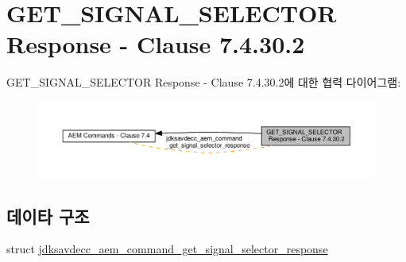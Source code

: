 \hypertarget{group__command__get__signal__selector__response}{}\section{G\+E\+T\+\_\+\+S\+I\+G\+N\+A\+L\+\_\+\+S\+E\+L\+E\+C\+T\+OR Response -\/ Clause 7.4.30.2}
\label{group__command__get__signal__selector__response}
G\+E\+T\+\_\+\+S\+I\+G\+N\+A\+L\+\_\+\+S\+E\+L\+E\+C\+T\+OR Response -\/ Clause 7.4.30.2에 대한 협력 다이어그램\+:
\nopagebreak
\begin{figure}[H]
\begin{center}
\leavevmode
\includegraphics[width=350pt]{group__command__get__signal__selector__response}
\end{center}
\end{figure}
\subsection*{데이타 구조}
\begin{DoxyCompactItemize}
\item 
struct \hyperlink{structjdksavdecc__aem__command__get__signal__selector__response}{jdksavdecc\+\_\+aem\+\_\+command\+\_\+get\+\_\+signal\+\_\+selector\+\_\+response}
\end{DoxyCompactItemize}
